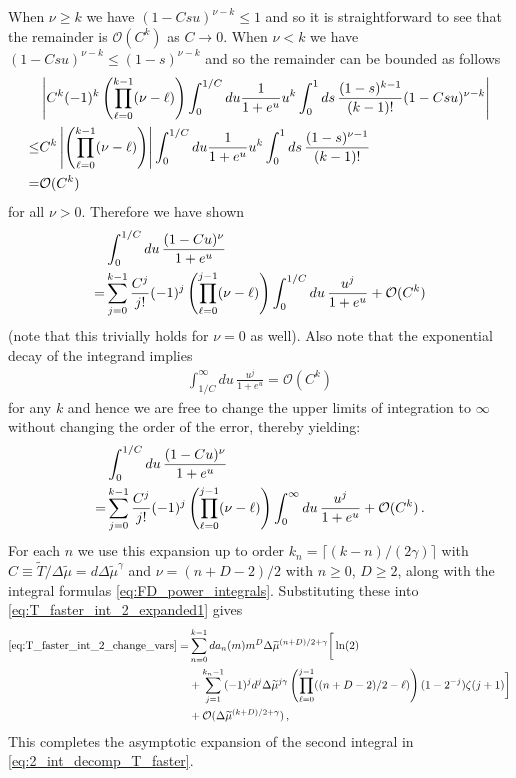 \documentclass[sn-mathphys,Numbered]{sn-jnl}
\begin{document}
When $\nu\geq k$  we have $(1-Csu)^{\nu-k}\leq 1$ and so it is straightforward to see that the remainder is $\mathcal{O}(C^k)$ as $C\to 0$.  When $\nu<k$ we have $(1-Csu)^{\nu-k}\leq (1-s)^{\nu-k}$ and so the remainder can be bounded as follows
\begin{align}
&\left|C^k (-1)^k\left(\prod_{\ell=0}^{k-1}(\nu-\ell)\right)\int_0^{1/C} du \frac{1}{1+e^u} u^k\int_0^1ds\,\frac{(1-s)^{k-1}}{(k-1)!} (1-Csu)^{\nu-k}\right|\notag\\
\leq&C^k\left| \left(\prod_{\ell=0}^{k-1}(\nu-\ell)\right)\right|\int_0^{1/C} du \frac{1}{1+e^u} u^k\int_0^1ds\,\frac{(1-s)^{\nu-1}}{(k-1)!} \notag\\
=&\mathcal{O}(C^k)
\end{align}
for all  $\nu>0$. Therefore we have shown
\begin{align}
&\int_0^{1/C} du \,\frac{(1-Cu)^\nu}{1+e^u}\\
=&\sum_{j=0}^{k-1}\frac{C^j}{j!}(-1)^j\left(\prod_{\ell=0}^{j-1}(\nu-\ell) \right)\int_0^{1/C} du \,\frac{u^j}{1+e^u}  +\mathcal{O}(C^k)\notag
\end{align}
(note that this trivially holds for $\nu=0$ as well).   Also note that the exponential decay of the integrand implies 
\begin{align}
\int_{1/C}^\infty du\, \frac{u^j}{1+e^u}=\mathcal{O}(C^k)
\end{align} for any $k$ and hence we are free to change the upper limits of integration to $\infty$ without changing the order of the error, thereby yielding:
\begin{align}
&\int_0^{1/C} du \,\frac{(1-Cu)^\nu}{1+e^u}\\
=&\sum_{j=0}^{k-1}\frac{C^j}{j!}(-1)^j\left(\prod_{\ell=0}^{j-1}(\nu-\ell) \right)\int_0^{\infty} du \,\frac{u^j}{1+e^u}  +\mathcal{O}(C^k)\,.\notag
\end{align}
For each $n$ we use this expansion up to order $k_n= \lceil(k-n)/(2\gamma)\rceil$ with $C\equiv \widetilde{T}/\Delta\widetilde{\mu}=d\Delta\widetilde{\mu}^{\gamma}$ and $\nu=(n+D-2)/2$ with $n\geq 0$, $D\geq 2$, along with the integral formulas 
\eqref{eq:FD_power_integrals}. Substituting  these into \eqref{eq:T_faster_int_2_expanded1} gives
\begin{align}    \label{eq:T_faster_int_2_expanded2}
    \eqref{eq:T_faster_int_2_change_vars} =&\sum_{n=0}^{k-1} da_n(m)m^{D}\Delta\widetilde{\mu}^{(n+D)/2+\gamma}\bigg[\ln(2)\\
    &+\sum_{j=1}^{k_n-1}(-1)^jd^j\Delta\widetilde{\mu}^{j\gamma}\left(\prod_{\ell=0}^{j-1}((n+D-2)/2-\ell) \right)(1-2^{-j})\zeta(j+1)  \bigg] \notag\\
    &+\mathcal{O}(\Delta\widetilde{\mu}^{(k+D)/2+\gamma})\notag\,,
\end{align}
This completes the asymptotic expansion of the second integral in  \eqref{eq:2_int_decomp_T_faster}.
\end{document}
